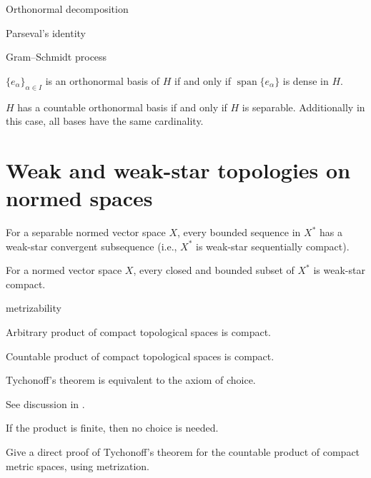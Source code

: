 Orthonormal decomposition

Parseval's identity

Gram--Schmidt process

\begin{thm}
    $\{e_\alpha\}_{\alpha \in I}$ is an orthonormal basis of $H$ if and only if $\operatorname{span}\{e_\alpha\}$ is dense in $H$.
\end{thm}

\begin{thm}
    $H$ has a countable orthonormal basis if and only if $H$ is separable. Additionally in this case, all bases have the same cardinality.
\end{thm}



\section{Weak and weak-star topologies on normed spaces}
\begin{namedthm}
    For a separable normed vector space $X$, every bounded sequence in $X^*$ has a weak-star convergent subsequence (i.e., $X^*$ is weak-star sequentially compact).
\end{namedthm}

\begin{namedthm}
    For a normed vector space $X$, every closed and bounded subset of $X^*$ is weak-star compact.
\end{namedthm}

metrizability

\begin{namedthm}
    Arbitrary product of compact topological spaces is compact.
\end{namedthm}

\begin{thm}
    Countable product of compact topological spaces is compact.
\end{thm}

Tychonoff's theorem is equivalent to the axiom of choice.

See discussion in  \cite[Section~4.8]{Herrlich_2006}.

If the product is finite, then no choice is needed.

\begin{xca}
    Give a direct proof of Tychonoff's theorem for the countable product of compact metric spaces, using metrization.
\end{xca}

